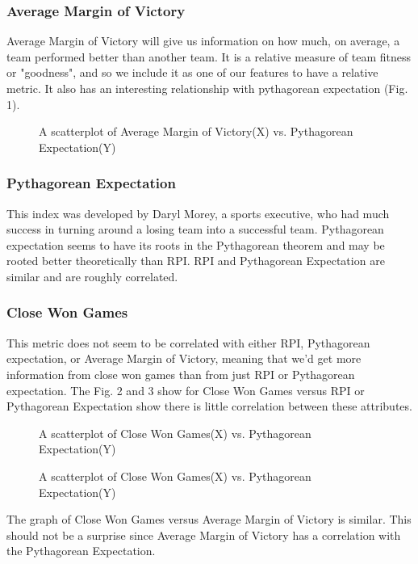 \documentclass{acm_proc_article-sp}
\begin{document}
\subsubsection{Average Margin of Victory}
Average Margin of Victory will give us information on how much, on average, a team performed better 
than another team. It is a relative measure of team fitness or "goodness", and so we include it as 
one of our features to have a relative metric. It also has an interesting relationship with 
pythagorean expectation (Fig. 1).
\begin{figure}
\centering
{}
\caption{A scatterplot of Average Margin of Victory(X) vs. Pythagorean Expectation(Y)}
\end{figure}
\subsubsection{Pythagorean Expectation}
This index was developed by Daryl Morey, a sports executive, who had much success in turning around 
a losing team into a successful team.\cite{feschuk} Pythagorean expectation seems to have its roots 
in the Pythagorean theorem and may be rooted better theoretically than RPI. RPI and Pythagorean 
Expectation are similar and are roughly correlated.
\subsubsection{Close Won Games}
This metric does not seem to be correlated with either RPI, Pythagorean expectation, or Average 
Margin of Victory, meaning that we'd get more information from close won games than from just RPI or 
Pythagorean expectation. The Fig. 2 and 3 show for Close Won Games versus RPI or Pythagorean 
Expectation show there is little correlation between these attributes.
\begin{figure}
\centering
{}
\caption{A scatterplot of Close Won Games(X) vs. Pythagorean Expectation(Y)}
\end{figure}
\begin{figure}
\centering
{}
\caption{A scatterplot of Close Won Games(X) vs. Pythagorean Expectation(Y)}
\end{figure}
The graph of Close Won Games versus Average Margin of Victory is similar. This should not be a 
surprise since Average Margin of Victory has a correlation with the Pythagorean Expectation.
\end{document}
